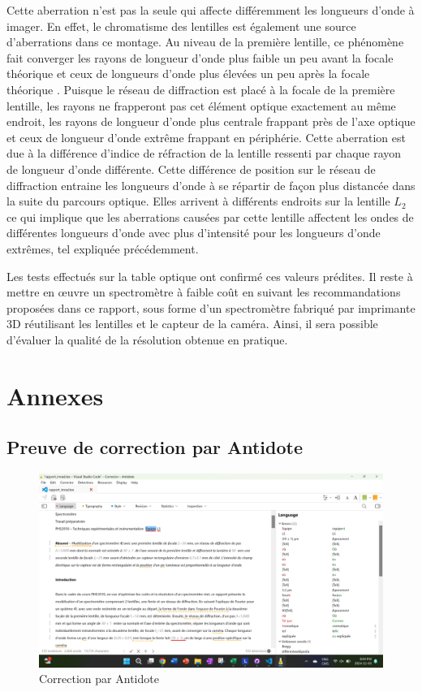 \documentclass[conference]{IEEEtran}
\begin{document}
Cette aberration n'est pas la seule qui affecte différemment les longueurs d'onde à imager. En effet, le chromatisme des lentilles
est également une source d'aberrations dans ce montage. Au niveau de la première lentille, ce phénomène fait converger les rayons 
de longueur d'onde plus faible un peu avant la focale théorique et ceux de longueurs d'onde plus élevées un peu après la focale
théorique \cite{wikipedia_aberration_chromatique}. Puisque le réseau de diffraction est placé à la focale de la première lentille, les rayons ne
frapperont pas cet élément optique exactement au même endroit, les rayons de longueur d'onde plus centrale frappant près de l'axe
optique et ceux de longueur d'onde extrême frappant en périphérie. Cette aberration est due à la différence d'indice de réfraction 
de la lentille ressenti par chaque rayon de longueur d'onde différente\cite{wikipedia_aberration_chromatique}. Cette différence 
de position sur le réseau de diffraction entraine les longueurs d'onde à se répartir de façon plus distancée dans la suite du parcours
optique. Elles arrivent à différents endroits sur la lentille $L_2$ ce qui implique que les aberrations causées par cette lentille
affectent les ondes de différentes longueurs d'onde avec plus d'intensité pour les longueurs d'onde extrêmes, tel expliquée précédemment.

Les tests effectués sur la table optique ont confirmé ces valeurs prédites. Il reste à mettre en œuvre un spectromètre à faible 
coût en suivant les recommandations proposées dans ce rapport, sous forme d'un spectromètre fabriqué par imprimante 3D réutilisant 
les lentilles et le capteur de la caméra. Ainsi, il sera possible d'évaluer la qualité de la résolution obtenue en pratique.

\printbibliography

\clearpage

\section{Annexes}

\subsection{Preuve de correction par Antidote}
\begin{figure}[H]
    \centering
    \includegraphics[scale=0.1]{Screenshot (111).png}
    \caption{Correction par Antidote}
\end{figure}


\clearpage
\end{document}
